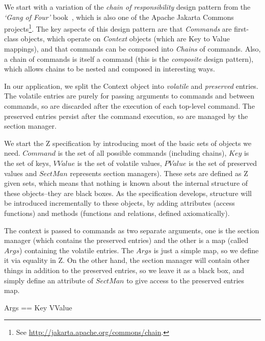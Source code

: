 \documentclass{llncs} %
\begin{document}
We start with a variation of the \emph{chain of responsibility} design
pattern from the \emph{`Gang of Four'} book~\cite{gamma:design-patts95},
which is also one of the Apache Jakarta Commons
projects\footnote{See \url{http://jakarta.apache.org/commons/chain}.}. 
The key aspects of this design pattern are that \emph{Commands} are
first-class objects, which operate on \emph{Context} objects (which are
Key to Value mappings), and that commands can be composed into
\emph{Chains} of commands.  Also, a chain of commands is itself
a command (this is the \emph{composite} design pattern), which allows
chains to be nested and composed in interesting ways.

In our application, we split the Context object into \emph{volatile}
and \emph{preserved} entries.  The volatile entries are purely for
passing arguments to commands and between commands, so are discarded after
the execution of each top-level command.  The preserved entries persist
after the command execution, so are managed by the section manager.

We start the Z specification by introducing most of the basic
sets of objects we need.  $Command$ is the set of all possible
commands (including chains), $Key$ is the set of keys, $VValue$ is the set
of volatile values, $PValue$ is the set of preserved values and $SectMan$
represents section managers).  These sets are defined as Z given sets, which
means that nothing is known about the internal structure of these
objects--they are black boxes.  As the specification develops,
structure will be introduced incrementally to these objects, by adding
attributes (access functions) and methods (functions and relations, defined
axiomatically).
\begin{zed}
\end{zed}

The context is passed to commands as two separate arguments, one
is the section manager (which contains the preserved entries) and the other
is a map (called $Args$) containing the volatile entries.  The $Args$
is just a simple map, so we define it via equality in Z.  On the other
hand, the section manager will contain other things in addition to the
preserved entries, so we leave it as a black box, and simply define an
attribute of $SectMan$ to give access to the preserved entries map.
\begin{zed}
  Args == Key \ffun VValue
\end{zed}
\end{document}
